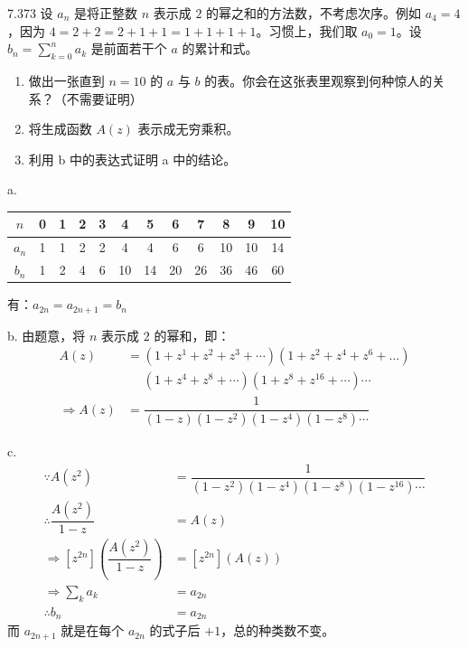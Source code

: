 \begin{problem}{7.37}{3}
  设 \( a_n \) 是将正整数 \( n \) 表示成 \( 2 \) 的幂之和的方法数，不考虑次序。例如 \( a_4 = 4 \)，因为 \( 4 = 2+2 = 2+1+1 = 1+1+1+1 \)。习惯上，我们取 \( a_0 = 1 \)。设 \( b_n = \sum_{k=0}^n a_k \) 是前面若干个 \( a \) 的累计和式。
  \begin{enumerate}
    \item[a] 做出一张直到 \( n=10 \) 的 \( a \) 与 \( b \) 的表。你会在这张表里观察到何种惊人的关系？（不需要证明）
    \item[b] 将生成函数 \( A(z) \) 表示成无穷乘积。
    \item[c] 利用 b 中的表达式证明 a 中的结论。
  \end{enumerate}
\end{problem}

a.
\begin{table}[ht]
  \centering
  {\color{grayblack}
    \begin{tabular}{c|c|c|c|c|c|c|c|c|c|c|c}
      \toprule
      \rowcolor{bluegray}
      \( n \) & 0 & 1 & 2 & 3 & 4 & 5 & 6 & 7 & 8 & 9 & 10 \\
      \midrule
      \( a_n \) & 1 & 1 & 2 & 2 & 4 & 4 & 6 & 6 & 10 & 10 & 14 \\
      \( b_n \) & 1 & 2 & 4 & 6 & 10 & 14 & 20 & 26 & 36 & 46 & 60 \\
      \bottomrule
  \end{tabular}}
\end{table}

有：\( a_{2n} = a_{2n+1} = b_n \)

b. 由题意，将 \( n \) 表示成 \( 2 \) 的幂和，即：
\begin{align*}
  A(z) &= (1 + z^1 + z^2 + z^3 + \cdots) (1 + z^2 + z^4 + z^6 + \dots) \\
  & \phantom{=} (1 + z^4 + z^8 + \cdots ) (1 + z^8 + z^{16} + \cdots) \cdots \\
  \Rightarrow
  A(z) &= \dfrac{1}{(1-z) (1-z^2) (1-z^4) (1-z^8) \cdots}
\end{align*}

c.
\begin{align*}
  \because A(z^2) &= \dfrac{1}{(1-z^2) (1-z^4) (1-z^8) (1-z^{16}) \cdots} \\
  \therefore \dfrac{A(z^2)}{1-z} &= A(z) \\
  \Rightarrow [z^{2n}] \left( \dfrac{A(z^2)}{1-z} \right) &= [z^{2n}] (A(z))\\
  \Rightarrow \sum_k a_k &= a_{2n} \\
  \therefore b_n &= a_{2n}
\end{align*}
而 \( a_{2n+1} \) 就是在每个 \( a_{2n} \) 的式子后 \( +1 \)，总的种类数不变。

